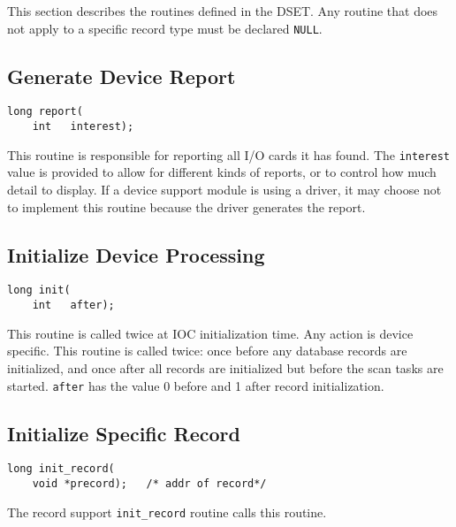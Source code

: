 This section describes the routines defined in the DSET.
Any routine that does not apply to a specific record type must be declared \verb|NULL|.

\subsection{Generate Device Report}

\begin{verbatim}
long report(
    int   interest);
\end{verbatim}

This routine is responsible for reporting all I/O cards it has found.
The \verb|interest| value is provided to allow for different kinds of reports, or to control how much detail to display.
If a device support module is using a driver, it may choose not to implement this routine because the driver generates the report.

\subsection{Initialize Device Processing}
\label{subsec:Initialize Device Processing}

\begin{verbatim}
long init(
    int   after);
\end{verbatim}

This routine is called twice at IOC initialization time.
Any action is device specific.
This routine is called twice: once before any database records are initialized, and once after all records are initialized but before the scan tasks are started.
\verb|after| has the value 0 before and 1 after record initialization.

\subsection{Initialize Specific Record}
\label{subsec:Initialize Specific Record}

\begin{verbatim}
long init_record(
    void *precord);   /* addr of record*/
\end{verbatim}

The record support \verb|init_record| routine calls this routine.

